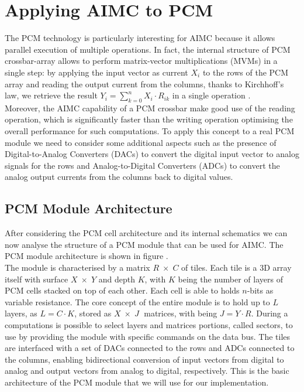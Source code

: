 \section{Applying AIMC to PCM}\label{sec:aimc_pcm}
The PCM technology is particularly interesting for AIMC because it allows parallel execution of multiple operations.
In fact, the internal structure of PCM crossbar-array  allows to perform matrix-vector multiplications (MVMs) in a single step:
by applying the input vector as current $X_i$ to the rows of the PCM array and reading the output current from the columns, thanks to Kirchhoff's law,
we retrieve the result $Y_i = \sum_{k=0}^{n} X_i \cdot R_{ik}$ in a single operation \cite{he_-memory_2023}.\\
Moreover, the AIMC capability of a PCM crossbar make good use of the reading operation, which is significantly faster than the writing operation optimising the overall performance for such computations.
To apply this concept to a real PCM module we need to consider some additional aspects such as the presence of Digital-to-Analog Converters (DACs) 
  to convert the digital input vector to analog signals for the rows and Analog-to-Digital Converters (ADCs) to convert the analog output currents from the columns back to digital values.

\subsection{PCM Module Architecture}\label{sec:PCM_Module_arch}
After considering the PCM cell architecture and its internal schematics we can now analyse the structure of a PCM module that can be used for AIMC.
The PCM module architecture is shown in figure .\\
The module is characterised by a matrix $R\;\times\;C$ of tiles. Each tile is a 3D array itself with surface $X \;\times\; Y$ and depth $K$, with $K$ being the 
number of layers of PCM cells stacked on top of each other. Each cell is able to holds $n$-bits as variable resistance. 
The core concept of the entire module is to hold up to $L$ layers, as $L = C \cdot K$, stored as $X\;\times\;J\;$ matrices, with being $J=Y\cdot R$. 
During a computations is possible to select layers and matrices portions, 
called sectors, to use by providing the module with specific commands on the data bus.
The tiles are interfaced with a set of DACs connected to the rows and ADCs connected to the columns, enabling bidirectional conversion of input vectors from digital to analog and output vectors from analog to digital, respectively.
This is the basic architecture of the PCM module that we will use for our implementation.

